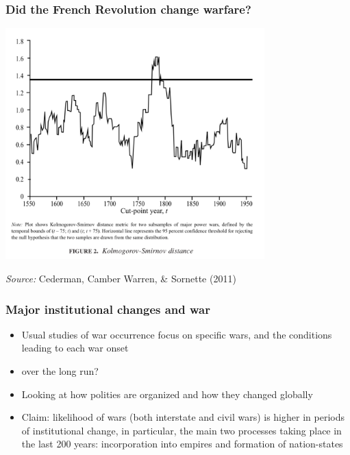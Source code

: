 \documentclass[aspectratio=43]{beamer}
\begin{document}
\begin{frame}
\frametitle{Did the French Revolution change warfare?}
\centering

\includegraphics[width = 0.75\textwidth]{img/cederman_et_al_fig2}

{\scriptsize \textit{Source:} Cederman, Camber Warren, \& Sornette (2011)}

\end{frame}

\begin{frame}
\frametitle{Major institutional changes and war}
\centering

\begin{itemize}
  \item Usual studies of war occurrence focus on specific wars, and the conditions leading to each war onset
  \item {} over the long run?
  \item Looking at how polities are organized and how they changed globally
  \item Claim: likelihood of wars (both interstate and civil wars) is higher in periods of institutional change, in particular, the main two processes taking place in the last 200 years: incorporation into empires and formation of nation-states
\end{itemize}

\end{frame}
\end{document}
